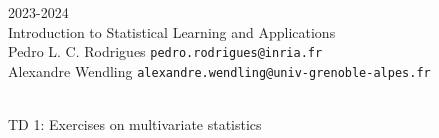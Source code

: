 \begin{flushleft}
 \hfill {} 2023-2024 \\
Introduction to Statistical Learning and Applications \\
Pedro L. C. Rodrigues   \hfill  \texttt{pedro.rodrigues@inria.fr} \\
Alexandre Wendling \hfill \texttt{alexandre.wendling@univ-grenoble-alpes.fr} \\

\HRuleTop\\
\begin{center}
\Large{TD 1: Exercises on multivariate statistics}
\end{center}
\HRuleBottom
\end{flushleft}
